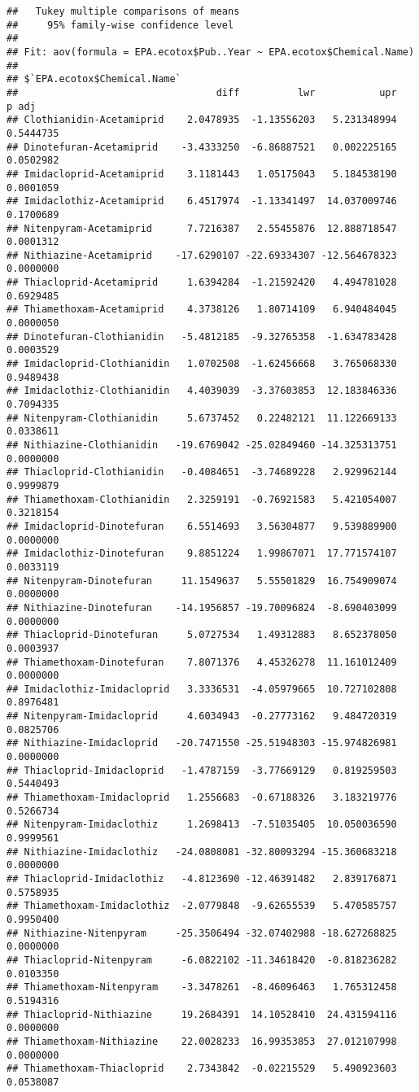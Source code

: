 \documentclass[]{article}
\begin{document}
\begin{verbatim}
##   Tukey multiple comparisons of means
##     95% family-wise confidence level
## 
## Fit: aov(formula = EPA.ecotox$Pub..Year ~ EPA.ecotox$Chemical.Name)
## 
## $`EPA.ecotox$Chemical.Name`
##                                  diff          lwr           upr     p adj
## Clothianidin-Acetamiprid    2.0478935  -1.13556203   5.231348994 0.5444735
## Dinotefuran-Acetamiprid    -3.4333250  -6.86887521   0.002225165 0.0502982
## Imidacloprid-Acetamiprid    3.1181443   1.05175043   5.184538190 0.0001059
## Imidaclothiz-Acetamiprid    6.4517974  -1.13341497  14.037009746 0.1700689
## Nitenpyram-Acetamiprid      7.7216387   2.55455876  12.888718547 0.0001312
## Nithiazine-Acetamiprid    -17.6290107 -22.69334307 -12.564678323 0.0000000
## Thiacloprid-Acetamiprid     1.6394284  -1.21592420   4.494781028 0.6929485
## Thiamethoxam-Acetamiprid    4.3738126   1.80714109   6.940484045 0.0000050
## Dinotefuran-Clothianidin   -5.4812185  -9.32765358  -1.634783428 0.0003529
## Imidacloprid-Clothianidin   1.0702508  -1.62456668   3.765068330 0.9489438
## Imidaclothiz-Clothianidin   4.4039039  -3.37603853  12.183846336 0.7094335
## Nitenpyram-Clothianidin     5.6737452   0.22482121  11.122669133 0.0338611
## Nithiazine-Clothianidin   -19.6769042 -25.02849460 -14.325313751 0.0000000
## Thiacloprid-Clothianidin   -0.4084651  -3.74689228   2.929962144 0.9999879
## Thiamethoxam-Clothianidin   2.3259191  -0.76921583   5.421054007 0.3218154
## Imidacloprid-Dinotefuran    6.5514693   3.56304877   9.539889900 0.0000000
## Imidaclothiz-Dinotefuran    9.8851224   1.99867071  17.771574107 0.0033119
## Nitenpyram-Dinotefuran     11.1549637   5.55501829  16.754909074 0.0000000
## Nithiazine-Dinotefuran    -14.1956857 -19.70096824  -8.690403099 0.0000000
## Thiacloprid-Dinotefuran     5.0727534   1.49312883   8.652378050 0.0003937
## Thiamethoxam-Dinotefuran    7.8071376   4.45326278  11.161012409 0.0000000
## Imidaclothiz-Imidacloprid   3.3336531  -4.05979665  10.727102808 0.8976481
## Nitenpyram-Imidacloprid     4.6034943  -0.27773162   9.484720319 0.0825706
## Nithiazine-Imidacloprid   -20.7471550 -25.51948303 -15.974826981 0.0000000
## Thiacloprid-Imidacloprid   -1.4787159  -3.77669129   0.819259503 0.5440493
## Thiamethoxam-Imidacloprid   1.2556683  -0.67188326   3.183219776 0.5266734
## Nitenpyram-Imidaclothiz     1.2698413  -7.51035405  10.050036590 0.9999561
## Nithiazine-Imidaclothiz   -24.0808081 -32.80093294 -15.360683218 0.0000000
## Thiacloprid-Imidaclothiz   -4.8123690 -12.46391482   2.839176871 0.5758935
## Thiamethoxam-Imidaclothiz  -2.0779848  -9.62655539   5.470585757 0.9950400
## Nithiazine-Nitenpyram     -25.3506494 -32.07402988 -18.627268825 0.0000000
## Thiacloprid-Nitenpyram     -6.0822102 -11.34618420  -0.818236282 0.0103350
## Thiamethoxam-Nitenpyram    -3.3478261  -8.46096463   1.765312458 0.5194316
## Thiacloprid-Nithiazine     19.2684391  14.10528410  24.431594116 0.0000000
## Thiamethoxam-Nithiazine    22.0028233  16.99353853  27.012107998 0.0000000
## Thiamethoxam-Thiacloprid    2.7343842  -0.02215529   5.490923603 0.0538087
\end{verbatim}
\end{document}
